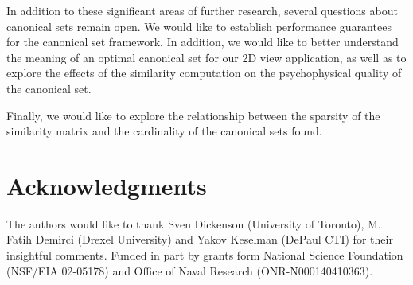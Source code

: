 \documentclass{ieee}
\begin{document}
In addition to these significant areas of further research, several
questions about canonical sets remain open.  We would like to
establish performance guarantees for the canonical set framework.  In
addition, we would like to better understand the meaning of an optimal
canonical set for our 2D view application, as well as to explore the
effects of the similarity computation on the psychophysical quality of
the canonical set.

Finally, we would like to explore the relationship between the
sparsity of the similarity matrix and the cardinality of the canonical
sets found.
\vspace{-0.1in}
\section*{Acknowledgments}
\vspace{-0.1in} The authors would like to thank Sven Dickenson
(University of Toronto), M.  Fatih Demirci (Drexel University) and
Yakov Keselman (DePaul CTI) for their insightful comments.  Funded in
part by grants form National Science Foundation (NSF/EIA 02-05178) and
Office of Naval Research (ONR-N000140410363).




\end{document}
